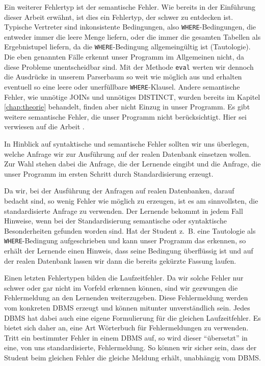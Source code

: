 Ein weiterer Fehlertyp ist der semantische Fehler. Wie bereits in der Einführung dieser Arbeit erwähnt, ist dies ein Fehlertyp, der schwer zu entdecken ist. Typische Vertreter sind inkonsistente Bedingungen, also \verb|WHERE|-Bedingungen, die entweder immer die leere Menge liefern, oder die immer die gesamten Tabellen als Ergebnistupel liefern, da die \verb|WHERE|-Bedingung allgemeingültig ist (Tautologie). Die eben genannten Fälle erkennt unser Programm im Allgemeinen nicht, da diese Probleme unentscheidbar sind. Mit der Methode \verb|eval| werten wir dennoch die Ausdrücke in unserem Parserbaum so weit wie möglich aus und erhalten eventuell so eine leere oder unerfüllbare \verb|WHERE|-Klausel. Andere semantische Fehler, wie unnötige JOINs und unnötiges DISTINCT, wurden bereits im Kapitel \ref{chap:theorie} behandelt, finden aber nicht Einzug in unser Programm. Es gibt weitere semantische Fehler, die unser Programm nicht berücksichtigt. Hier sei verwiesen auf die Arbeit \cite{brass2}. 

In Hinblick auf syntaktische und semantische Fehler sollten wir uns überlegen, welche Anfrage wir zur Ausführung auf der realen Datenbank einsetzen wollen. Zur Wahl stehen dabei die Anfrage, die der Lernende eingibt und die Anfrage, die unser Programm im ersten Schritt durch Standardisierung erzeugt. 

Da wir, bei der Ausführung der Anfragen auf realen Datenbanken, darauf bedacht sind, so wenig Fehler wie möglich zu erzeugen, ist es am sinnvollsten, die standardisierte Anfrage zu verwenden. Der Lernende bekommt in jedem Fall Hinweise, wenn bei der Standardisierung semantische oder syntaktische Besonderheiten gefunden worden sind. Hat der Student \mbox{z. B.} eine Tautologie als \verb|WHERE|-Bedingung aufgeschrieben und kann unser Programm das erkennen, so erhält der Lernende einen Hinweis, dass seine Bedingung überflüssig ist und auf der realen Datenbank lassen wir dann die bereits gekürzte Fassung laufen. 

Einen letzten Fehlertypen bilden die Laufzeitfehler. Da wir solche Fehler nur schwer oder gar nicht im Vorfeld erkennen können, sind wir gezwungen die Fehlermeldung an den Lernenden weiterzugeben. Diese Fehlermeldung werden vom konkreten DBMS erzeugt und können mitunter unverständlich sein. Jedes DBMS hat dabei auch eine eigene Formulierung für die gleichen Laufzeitfehler. Es bietet sich daher an, eine Art Wörterbuch für Fehlermeldungen zu verwenden. Tritt ein bestimmter Fehler in einem DBMS auf, so wird dieser "`übersetzt"' in eine, von uns standardisierte, Fehlermeldung. So können wir sicher sein, dass der Student beim gleichen Fehler die gleiche Meldung erhält, unabhängig vom DBMS.
